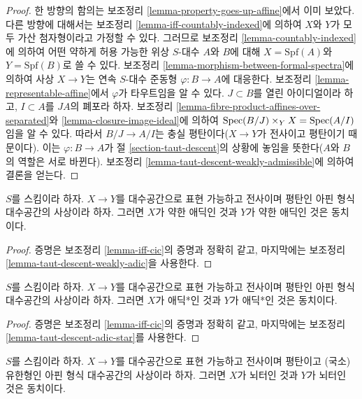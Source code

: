 \begin{proof}
한 방향의 함의는 보조정리 \ref{lemma-property-goes-up-affine}에서
이미 보았다. 다른 방향에 대해서는 보조정리
\ref{lemma-iff-countably-indexed}에 의하여 $X$와 $Y$가 모두 가산
첨자형이라고 가정할 수 있다. 그러므로 보조정리
\ref{lemma-countably-indexed}에 의하여 어떤 약하게 허용 가능한 위상
$S$-대수 $A$와 $B$에 대해 $X = \text{Spf}(A)$와
$Y = \text{Spf}(B)$로 쓸 수 있다. 보조정리
\ref{lemma-morphism-between-formal-spectra}에 의하여 사상
$X \to Y$는 연속 $S$-대수 준동형 $\varphi : B \to A$에 대응한다.
보조정리 \ref{lemma-representable-affine}에서 $\varphi$가 타우트임을
알 수 있다. $J \subset B$를 열린 아이디얼이라 하고,
$I \subset A$를 $JA$의 폐포라 하자. 보조정리
\ref{lemma-fibre-product-affines-over-separated}와
\ref{lemma-closure-image-ideal}에 의하여
$\mathop{\mathrm{Spec}}(B/J) \times_Y X = \mathop{\mathrm{Spec}}(A/I)$임을 알 수 있다.
따라서 $B/J \to A/I$는 충실 평탄이다($X \to Y$가 전사이고
평탄이기 때문이다). 이는 $\varphi : B \to A$가 절
\ref{section-taut-descent}의 상황에 놓임을 뜻한다($A$와 $B$의
역할은 서로 바뀐다). 보조정리
\ref{lemma-taut-descent-weakly-admissible}에 의하여 결론을 얻는다.
\end{proof}

\begin{lemma}
\label{lemma-iff-weakly-adic}
$S$를 스킴이라 하자. $X \to Y$를 대수공간으로 표현 가능하고
전사이며 평탄인 아핀 형식 대수공간의 사상이라 하자. 그러면
$X$가 약한 애딕인 것과 $Y$가 약한 애딕인 것은 동치이다.
\end{lemma}

\begin{proof}
증명은 보조정리 \ref{lemma-iff-cic}의 증명과 정확히 같고,
마지막에는 보조정리 \ref{lemma-taut-descent-weakly-adic}을 사용한다.
\end{proof}

\begin{lemma}
\label{lemma-iff-adic-star}
$S$를 스킴이라 하자. $X \to Y$를 대수공간으로 표현 가능하고
전사이며 평탄인 아핀 형식 대수공간의 사상이라 하자. 그러면
$X$가 애딕*인 것과 $Y$가 애딕*인 것은 동치이다.
\end{lemma}

\begin{proof}
증명은 보조정리 \ref{lemma-iff-cic}의 증명과 정확히 같고,
마지막에는 보조정리 \ref{lemma-taut-descent-adic-star}를 사용한다.
\end{proof}

\begin{lemma}
\label{lemma-iff-noetherian}
$S$를 스킴이라 하자. $X \to Y$를 대수공간으로 표현 가능하고
전사이며 평탄이고 (국소) 유한형인 아핀 형식 대수공간의 사상이라
하자. 그러면 $X$가 뇌터인 것과 $Y$가 뇌터인 것은 동치이다.
\end{lemma}

